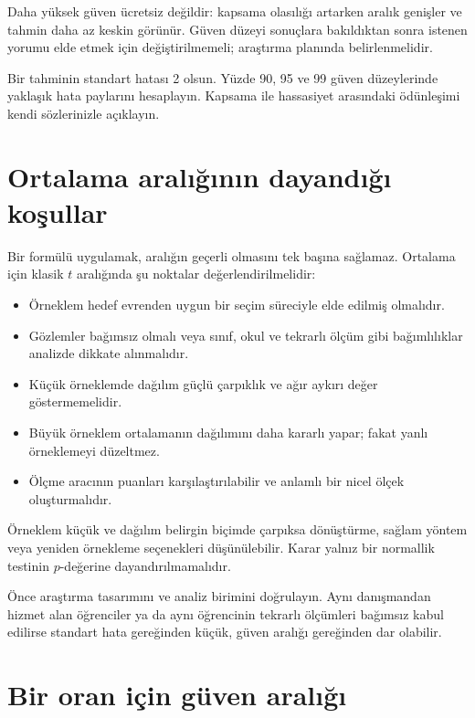 Daha yüksek güven ücretsiz değildir: kapsama olasılığı artarken aralık
genişler ve tahmin daha az keskin görünür. Güven düzeyi sonuçlara bakıldıktan
sonra istenen yorumu elde etmek için değiştirilmemeli; araştırma planında
belirlenmelidir.

\begin{etkinlik}
Bir tahminin standart hatası 2 olsun. Yüzde 90, 95 ve 99 güven düzeylerinde
yaklaşık hata paylarını hesaplayın. Kapsama ile hassasiyet arasındaki
ödünleşimi kendi sözlerinizle açıklayın.
\end{etkinlik}

\section{Ortalama aralığının dayandığı koşullar}

Bir formülü uygulamak, aralığın geçerli olmasını tek başına sağlamaz. Ortalama
için klasik $t$ aralığında şu noktalar değerlendirilmelidir:

\begin{itemize}
  \item Örneklem hedef evrenden uygun bir seçim süreciyle elde edilmiş olmalıdır.
  \item Gözlemler bağımsız olmalı veya sınıf, okul ve tekrarlı ölçüm gibi bağımlılıklar analizde dikkate alınmalıdır.
  \item Küçük örneklemde dağılım güçlü çarpıklık ve ağır aykırı değer göstermemelidir.
  \item Büyük örneklem ortalamanın dağılımını daha kararlı yapar; fakat yanlı örneklemeyi düzeltmez.
  \item Ölçme aracının puanları karşılaştırılabilir ve anlamlı bir nicel ölçek oluşturmalıdır.
\end{itemize}

Örneklem küçük ve dağılım belirgin biçimde çarpıksa dönüştürme, sağlam yöntem
veya yeniden örnekleme seçenekleri düşünülebilir. Karar yalnız bir normallik
testinin $p$-değerine dayandırılmamalıdır.

\begin{assumptionbox}
Önce araştırma tasarımını ve analiz birimini doğrulayın. Aynı danışmandan
hizmet alan öğrenciler ya da aynı öğrencinin tekrarlı ölçümleri bağımsız kabul
edilirse standart hata gereğinden küçük, güven aralığı gereğinden dar olabilir.
\end{assumptionbox}

\section{Bir oran için güven aralığı}

